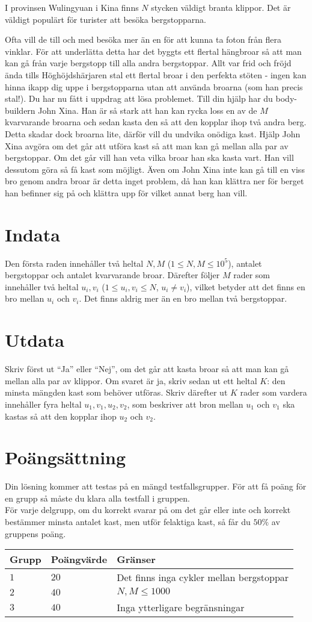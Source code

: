 \noindent
I provinsen Wulingyuan i Kina finns $N$ stycken väldigt branta klippor. Det är väldigt populärt för turister att besöka bergstopparna.

Ofta vill de till och med besöka mer än en för att kunna ta foton från flera vinklar. För att underlätta detta har det byggts ett flertal hängbroar så att
man kan gå från varje bergstopp till alla andra bergstoppar. Allt var frid och fröjd ända tills Höghöjdshärjaren stal ett flertal broar i den perfekta stöten - ingen kan hinna ikapp
dig uppe i bergstopparna utan att använda broarna (som han precis stal!). Du har nu fått i uppdrag att lösa problemet. Till din hjälp har du body-buildern John Xina. Han är så stark att han kan rycka loss
en av de $M$ kvarvarande broarna och sedan kasta den så att den kopplar ihop två andra berg. Detta skadar dock broarna lite, därför vill du undvika onödiga kast. 
Hjälp John Xina avgöra om det går att utföra kast så att man kan gå mellan alla par av bergstoppar. Om det går vill han veta vilka broar han ska kasta vart.
Han vill dessutom göra så få kast som möjligt. Även om John Xina inte kan gå till en viss bro genom andra broar är detta inget problem, då han kan klättra ner för berget han befinner
sig på och klättra upp för vilket annat berg han vill.


\section*{Indata}
\noindent
Den första raden innehåller två heltal $N,M$ ($1 \leq N,M \leq 10^5$), antalet bergstoppar och antalet kvarvarande broar.
Därefter följer $M$ rader som innehåller två heltal $u_i, v_i$ ($1 \leq u_i, v_i \leq N$, $u_i \neq v_i$), vilket betyder att det finns en bro mellan $u_i$ och $v_i$. Det finns aldrig mer än en bro mellan två bergstoppar.

\section*{Utdata}
\noindent
Skriv först ut ``Ja'' eller ``Nej'', om det går att kasta broar så att man kan gå mellan alla par av klippor.
Om svaret är ja, skriv sedan ut ett heltal $K$: den minsta mängden kast som behöver utföras.
Skriv därefter ut $K$ rader som vardera innehåller fyra heltal $u_1, v_1, u_2, v_2$, som beskriver att bron mellan $u_1$ och $v_1$ ska kastas så att den kopplar ihop $u_2$ och $v_2$.
\section*{Poängsättning}
\noindent
Din lösning kommer att testas på en mängd testfallsgrupper.
För att få poäng för en grupp så måste du klara alla testfall i gruppen. \\
För varje delgrupp, om du korrekt svarar på om det går eller inte och korrekt bestämmer minsta antalet kast, men utför felaktiga kast, så får du $50\%$ av gruppens poäng.


\noindent
\begin{tabular}{| l | l | l |}
\hline
  Grupp & Poängvärde & Gränser \\ \hline
  $1$    & $20$       &  Det finns inga cykler mellan bergstoppar \\ \hline 
  $2$    & $40$       &  $N, M \leq 1000$ \\ \hline
  $3$    & $40$       &  Inga ytterligare begränsningar \\ \hline
\end{tabular}
